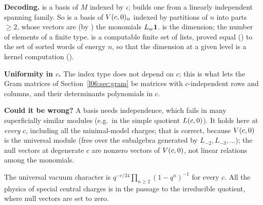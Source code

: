 \begin{dictionary}
\textbf{Decoding.}  is a basis of $M$ indexed by $\iota$;
 builds one from a linearly independent spanning family. So 
is a basis of $V(c,0)_n$ indexed by partitions of $n$ into parts $\ge2$, whose vectors are (by
) the monomials $L_w\mathbf{1}$.  is the dimension;
 the number of elements of a finite type.  is a computable finite
set of lists, proved equal () to the set of sorted words of energy $n$, so that
the dimension at a given level is a kernel computation (\allowbreak{}\allowbreak{}\allowbreak{}).

\textbf{Uniformity in $c$.} The index type  does not depend on $c$; this is what
lets the Gram matrices of Section~\ref{l06:sec:gram} be matrices with $c$-independent rows and columns,
and their determinants polynomials in $c$.

\textbf{Could it be wrong?} A basis needs independence, which fails in many superficially similar
modules (e.g.\ in the simple quotient $L(c,0)$). It holds here at \emph{every} $c$, including all the
minimal-model charges; that is correct, because $V(c,0)$ is the universal module (free over the
subalgebra generated by $L_{-2},L_{-3},\dots$); the null vectors at degenerate $c$ are nonzero vectors
of $V(c,0)$, not linear relations among the monomials.
\end{dictionary}

\begin{physics}
The universal vacuum character is $q^{-c/24}\prod_{n\ge2}(1-q^n)^{-1}$ for every $c$. All the physics of
special central charges is in the passage to the irreducible quotient, where null vectors are set to
zero.
\end{physics}

